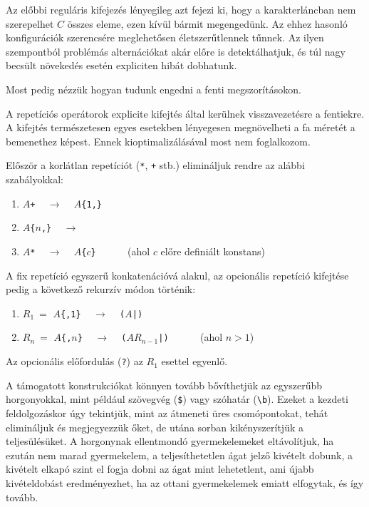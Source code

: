 \documentclass[
    parspace,
    noindent,
    nohyp,
]{elteiktdk}[2023/04/10]
\newcommand{\regextt}[1]{\texttt{\colorbox{verylightgray}{#1}}}
\begin{document}
Az előbbi reguláris kifejezés lényegileg azt fejezi ki,
hogy a karakterláncban nem szerepelhet $C$ összes eleme, ezen kívül bármit megengedünk.
Az ehhez hasonló konfigurációk szerencsére meglehetősen életszerűtlennek tűnnek.
Az ilyen szempontból problémás alternációkat akár előre is detektálhatjuk,
és túl nagy becsült növekedés esetén expliciten hibát dobhatunk.

Most pedig nézzük hogyan tudunk engedni a fenti megszorításokon.

A repetíciós operátorok explicite kifejtés által kerülnek visszavezetésre a fentiekre.
A kifejtés természetesen egyes esetekben lényegesen megnövelheti a fa méretét a bemenethez képest.
Ennek kioptimalizálásával most nem foglalkozom.

Először a korlátlan repetíciót (\texttt{*}, \texttt{+} stb.) elimináljuk rendre az alábbi szabályokkal:

\begin{enumerate}
    \item \texttt{$A$+} ~ $\longrightarrow$ ~ \texttt{$A$\{1,\}}
    \item \texttt{$A$\{$n$,\}} ~ $\longrightarrow$ ~ 
    \item \texttt{$A$*} ~ $\longrightarrow$ ~ \texttt{$A$\{$c$\}} ~~~~~ (ahol $c$ előre definiált konstans)
\end{enumerate}

A fix repetíció egyszerű konkatenációvá alakul,
az opcionális repetíció kifejtése pedig a következő rekurzív módon történik:

\begin{enumerate}
    \item $R_1~=$ \texttt{$A$\{,1\}} ~ $\longrightarrow$ ~ \texttt{($A$|)}
    \item $R_n~=$ \texttt{$A$\{,$n$\}} ~ $\longrightarrow$ ~ \texttt{($AR_{n-1}$|)} ~~~~~ (ahol $n>1$)
\end{enumerate}

Az opcionális előfordulás (\regextt{?}) az $R_1$ esettel egyenlő.

A támogatott konstrukciókat könnyen tovább bővíthetjük az egyszerűbb horgonyokkal,
mint például szövegvég (\regextt{\$}) vagy szóhatár (\regextt{{\textbackslash}b}).
Ezeket a kezdeti feldolgozáskor úgy tekintjük,
mint az átmeneti üres csomópontokat, tehát elimináljuk és megjegyezzük őket,
de utána sorban kikényszerítjük a teljesülésüket.
A horgonynak ellentmondó gyermekelemeket eltávolítjuk,
ha ezután nem marad gyermekelem, a teljesíthetetlen ágat jelző kivételt dobunk,
a kivételt elkapó szint el fogja dobni az ágat mint lehetetlent,
ami újabb kivételdobást eredményezhet, ha az ottani gyermekelemek emiatt elfogytak,
és így tovább.
\end{document}
